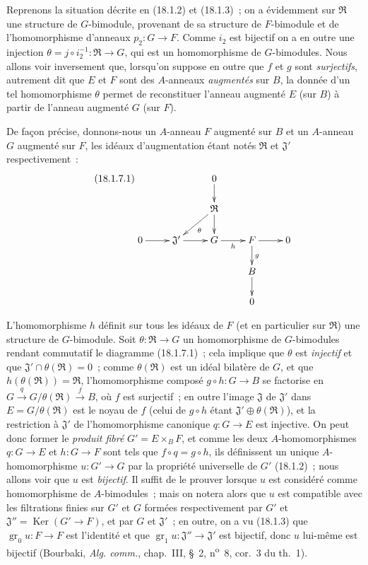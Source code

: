 \begin{env}[18.1.7]
\label{0.18.1.7-fr}
Reprenons la situation décrite en (18.1.2) et (18.1.3)~; on a évidemment sur
$\mathfrak{R}$ une structure de $G$-bimodule, provenant de sa structure de
$F$-bimodule et de l'homomorphisme d'anneaux $p_2:G\to F$. Comme $i_2$ est
bijectif on a en outre une injection
$\theta=j\circ i_2^{-1}:\mathfrak{R}\to G$, qui est un homomorphisme de
$G$-bimodules. Nous allons voir inversement que, lorsqu'on suppose en outre
que $f$ et $g$ sont \emph{surjectifs}, autrement dit que $E$ et $F$ sont des
$A$-anneaux \emph{augmentés} sur $B$, la donnée d'un tel homomorphisme
$\theta$ permet de reconstituer l'anneau augmenté $E$ (sur $B$) à partir de
l'anneau augmenté $G$ (sur $F$).

De façon précise, donnons-nous un $A$-anneau $F$ augmenté sur $B$ et un
$A$-anneau $G$ augmenté sur $F$, les idéaux d'augmentation étant notés
$\mathfrak{R}$ et $\mathfrak{J}'$ respectivement~:
\begin{equation}
\label{0.18.1.7.1-fr}
\tag{18.1.7.1}
  \xymatrix@C=2pc@R=1.5pc{
    & & 0\ar[d] & & \\
    & & \mathfrak{R}\ar[ld]^\theta\ar[d] & & \\
    0\ar[r] & \mathfrak{J}'\ar[r] & G\ar[r]_h & F\ar[r]\ar[d]^g & 0\\
    & & & B\ar[d] & \\
    & & & 0 &
  }
\end{equation}

L'homomorphisme $h$ définit sur tous les idéaux de $F$ (et en particulier sur
$\mathfrak{R}$) une structure de $G$-bimodule. Soit
$\theta:\mathfrak{R}\to G$ un homomorphisme de $G$-bimodules rendant
commutatif le diagramme (18.1.7.1)~; cela implique que $\theta$ est
\emph{injectif} et que $\mathfrak{J}'\cap\theta(\mathfrak{R})=0$~; comme
$\theta(\mathfrak{R})$ est un idéal bilatère de $G$, et que
$h(\theta(\mathfrak{R}))=\mathfrak{R}$, l'homomorphisme composé
$g\circ h:G\to B$ se factorise en
$G\xrightarrow{q}G/\theta(\mathfrak{R})\xrightarrow{f}B$, où $f$ est
surjectif~; en outre l'image $\mathfrak{J}$ de $\mathfrak{J}'$ dans
$E=G/\theta(\mathfrak{R})$ est le noyau de $f$ (celui de $g\circ h$ étant
$\mathfrak{J}'\oplus\theta(\mathfrak{R})$), et la restriction à
$\mathfrak{J}'$ de l'homomorphisme canonique $q:G\to E$ est injective. On
peut donc former le \emph{produit fibré} $G'=E\times_BF$, et comme les deux
$A$-homomorphismes $q:G\to E$ et $h:G\to F$ sont tels que
$f\circ q=g\circ h$, ils définissent un unique $A$-homomorphisme $u:G'\to G$
par la propriété universelle de $G'$ (18.1.2)~; nous allons voir que $u$ est
\emph{bijectif}. Il suffit de le prouver lorsque $u$ est considéré comme
homomorphisme de $A$-bimodules~; mais on notera alors que $u$ est compatible
avec les filtrations finies sur $G'$ et $G$ formées respectivement par $G'$
et $\mathfrak{J}''=\operatorname{Ker}(G'\to F)$, et par $G$ et
$\mathfrak{J}'$~; en outre, on a vu (18.1.3) que
$\operatorname{gr}_0u:F\to F$ est l'identité et que
$\operatorname{gr}_1u:\mathfrak{J}''\to\mathfrak{J}'$ est bijectif, donc $u$
lui-même est bijectif (Bourbaki, \emph{Alg. comm.}, chap.~III, \S~2,
n\textsuperscript{o}~8, cor.~3 du th.~1).
\end{env}

